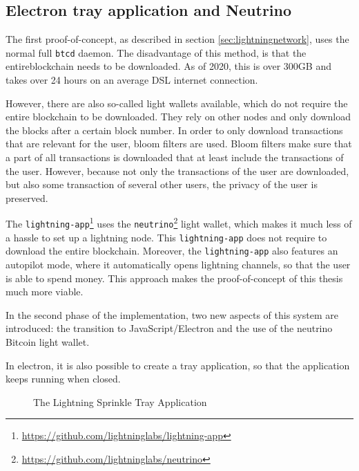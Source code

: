 \subsection{Electron tray application and Neutrino}
\label{sec:electron}
The first proof-of-concept, as described in section \ref{sec:lightningnetwork}, uses the normal full \texttt{btcd} daemon. The disadvantage of this method, is that the entireblockchain needs to be downloaded. As of 2020, this is over 300GB and takes over 24 hours on an average DSL internet connection. 

However, there are also so-called light wallets available, which do not require the entire blockchain to be downloaded. They rely on other nodes and only download the blocks after a certain block number. In order to only download transactions that are relevant for the user, bloom filters are used. Bloom filters make sure that a part of all transactions is downloaded that at least include the transactions of the user. However, because not only the transactions of the user are downloaded, but also some transaction of several other users, the privacy of the user is preserved.

The \texttt{lightning-app}\footnote{\url{https://github.com/lightninglabs/lightning-app}} uses the \texttt{neutrino}\footnote{\url{https://github.com/lightninglabs/neutrino}} light wallet, which makes it much less of a hassle to set up a lightning node. This \texttt{lightning-app} does not require to download the entire blockchain. Moreover, the \texttt{lightning-app} also features an autopilot mode, where it automatically opens lightning channels, so that the user is able to spend money. This approach makes the proof-of-concept of this thesis much more viable. 

In the second phase of the implementation, two new aspects of this system are introduced: the transition to JavaScript/Electron and the use of the neutrino Bitcoin light wallet.

In electron, it is also possible to create a tray application, so that the application keeps running when closed. 


\begin{figure}[h!]
  \setlength{\fboxsep}{0pt}%
  \center
  \caption{The Lightning Sprinkle Tray Application}
\end{figure}

